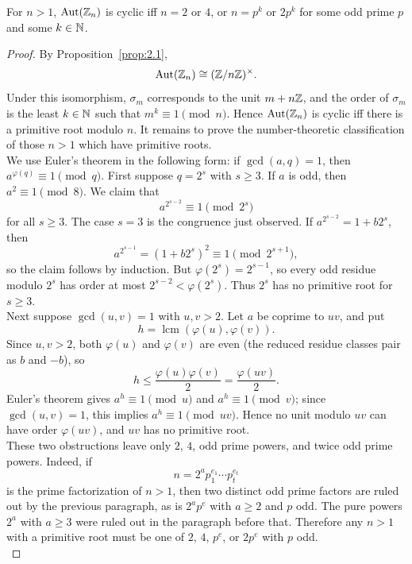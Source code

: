 \documentclass[../Odyssey_Project.tex]{subfiles}
\begin{document}
\begin{theorem}
\label{thm:2.3}
For $n > 1$, $\operatorname{Aut}(\mathbb{Z}_n)$ is cyclic iff $n = 2$ or $4$, or $n = p^k$ or $2p^k$ for some odd prime $p$ and some $k \in \mathbb{N}$.
\end{theorem}
\begin{proof}
    By Proposition~\ref{prop:2.1},
    \[
        \operatorname{Aut}(\mathbb{Z}_n) \cong (\mathbb{Z}/n\mathbb{Z})^{\times}.
    \]
    Under this isomorphism, $\sigma_m$ corresponds to the unit $m + n\mathbb{Z}$, and the order of $\sigma_m$ is the least $k \in \mathbb{N}$ such that $m^k \equiv 1 \pmod{n}$. Hence $\operatorname{Aut}(\mathbb{Z}_n)$ is cyclic iff there is a primitive root modulo $n$. It remains to prove the number-theoretic classification of those $n > 1$ which have primitive roots. \\
    We use Euler's theorem in the following form: if $\gcd(a,q) = 1$, then $a^{\varphi(q)} \equiv 1 \pmod{q}$. First suppose $q = 2^s$ with $s \geq 3$. If $a$ is odd, then $a^2 \equiv 1 \pmod{8}$. We claim that
    \[
        a^{2^{s-2}} \equiv 1 \pmod{2^s}
    \]
    for all $s \geq 3$. The case $s = 3$ is the congruence just observed. If $a^{2^{s-2}} = 1 + b2^s$, then
    \[
        a^{2^{s-1}} = (1 + b2^s)^2 \equiv 1 \pmod{2^{s+1}},
    \]
    so the claim follows by induction. But $\varphi(2^s) = 2^{s-1}$, so every odd residue modulo $2^s$ has order at most $2^{s-2} < \varphi(2^s)$. Thus $2^s$ has no primitive root for $s \geq 3$. \\
    Next suppose $\gcd(u,v) = 1$ with $u,v > 2$. Let $a$ be coprime to $uv$, and put
    \[
        h = \operatorname{lcm}(\varphi(u), \varphi(v)).
    \]
    Since $u,v > 2$, both $\varphi(u)$ and $\varphi(v)$ are even (the reduced residue classes pair as $b$ and $-b$), so
    \[
        h \leq \frac{\varphi(u)\varphi(v)}{2} = \frac{\varphi(uv)}{2}.
    \]
    Euler's theorem gives $a^h \equiv 1 \pmod{u}$ and $a^h \equiv 1 \pmod{v}$; since $\gcd(u,v) = 1$, this implies $a^h \equiv 1 \pmod{uv}$. Hence no unit modulo $uv$ can have order $\varphi(uv)$, and $uv$ has no primitive root. \\
    These two obstructions leave only $2$, $4$, odd prime powers, and twice odd prime powers. Indeed, if
    \[
        n = 2^a p_1^{e_1} \cdots p_t^{e_t}
    \]
    is the prime factorization of $n > 1$, then two distinct odd prime factors are ruled out by the previous paragraph, as is $2^a p^e$ with $a \geq 2$ and $p$ odd. The pure powers $2^a$ with $a \geq 3$ were ruled out in the paragraph before that. Therefore any $n > 1$ with a primitive root must be one of $2$, $4$, $p^e$, or $2p^e$ with $p$ odd. \\

\end{proof}
\end{document}
